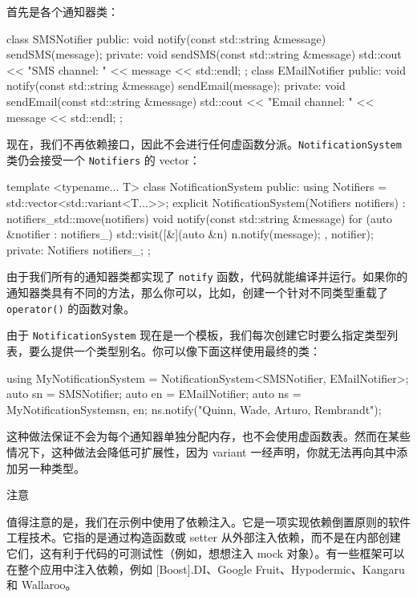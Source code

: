 首先是各个通知器类：

\begin{codebox}[cpp]
class SMSNotifier {
public:
    void notify(const std::string &message) { sendSMS(message); }
private:
    void sendSMS(const std::string &message) {
        std::cout << "SMS channel: " << message << std::endl;
    }
};
class EMailNotifier {
public:
    void notify(const std::string &message) { sendEmail(message); }
private:
    void sendEmail(const std::string &message) {
        std::cout << "Email channel: " << message << std::endl;
    }
};
\end{codebox}

现在，我们不再依赖接口，因此不会进行任何虚函数分派。\texttt{Notification\allowbreak{}System} 类仍会接受一个 \texttt{Notifiers} 的 vector：

\begin{codebox}[cpp]
template <typename... T>
class NotificationSystem {
public:
    using Notifiers = std::vector<std::variant<T...>>;
    explicit NotificationSystem(Notifiers notifiers)
        : notifiers_{std::move(notifiers)} {}
    void notify(const std::string &message) {
        for (auto &notifier : notifiers_) {
            std::visit([&](auto &n) { n.notify(message); }, notifier);
        }
    }
private:
    Notifiers notifiers_;
};
\end{codebox}

由于我们所有的通知器类都实现了 \texttt{notify} 函数，代码就能编译并运行。如果你的通知器类具有不同的方法，那么你可以，比如，创建一个针对不同类型重载了 \texttt{operator(\allowbreak{})\allowbreak{}} 的函数对象。

由于 \texttt{Notification\allowbreak{}System} 现在是一个模板，我们每次创建它时要么指定类型列表，要么提供一个类型别名。你可以像下面这样使用最终的类：

\begin{codebox}[text]
using MyNotificationSystem = NotificationSystem<SMSNotifier, EMailNotifier>;
auto sn = SMSNotifier{};
auto en = EMailNotifier{};
auto ns = MyNotificationSystem{{sn, en}};
ns.notify("Quinn, Wade, Arturo, Rembrandt");
\end{codebox}

\label{idx:064}
\label{idx:065}
这种做法保证不会为每个通知器单独分配内存，也不会使用虚函数表。然而在某些情况下，这种做法会降低可扩展性，因为 variant 一经声明，你就无法再向其中添加另一种类型。

\begin{myNotic}{注意}

值得注意的是，我们在示例中使用了依赖注入。它是一项实现依赖倒置原则的软件工程技术。它指的是通过构造函数或 setter 从外部注入依赖，而不是在内部创建它们，这有利于代码的可测试性（例如，想想注入 mock 对象）。有一些框架可以在整个应用中注入依赖，例如 [Boost].DI、Google Fruit、Hypodermic、Kangaru 和 Wallaroo。
\end{myNotic}

